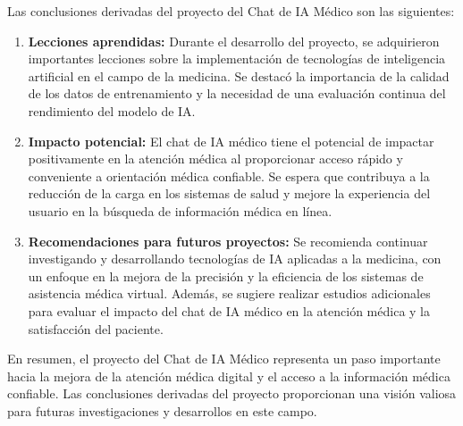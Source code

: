 \documentclass[conference]{IEEEtran}
\begin{document}
Las conclusiones derivadas del proyecto del Chat de IA Médico son las siguientes:
\begin{enumerate}
    \item \textbf{Lecciones aprendidas:} Durante el desarrollo del proyecto, se adquirieron importantes lecciones sobre la implementación de tecnologías de inteligencia artificial en el campo de la medicina. Se destacó la importancia de la calidad de los datos de entrenamiento y la necesidad de una evaluación continua del rendimiento del modelo de IA.
    
    \item \textbf{Impacto potencial:} El chat de IA médico tiene el potencial de impactar positivamente en la atención médica al proporcionar acceso rápido y conveniente a orientación médica confiable. Se espera que contribuya a la reducción de la carga en los sistemas de salud y mejore la experiencia del usuario en la búsqueda de información médica en línea.
    
    \item \textbf{Recomendaciones para futuros proyectos:} Se recomienda continuar investigando y desarrollando tecnologías de IA aplicadas a la medicina, con un enfoque en la mejora de la precisión y la eficiencia de los sistemas de asistencia médica virtual. Además, se sugiere realizar estudios adicionales para evaluar el impacto del chat de IA médico en la atención médica y la satisfacción del paciente.
\end{enumerate}


En resumen, el proyecto del Chat de IA Médico representa un paso importante hacia la mejora de la atención médica digital y el acceso a la información médica confiable. Las conclusiones derivadas del proyecto proporcionan una visión valiosa para futuras investigaciones y desarrollos en este campo.
\end{document}
